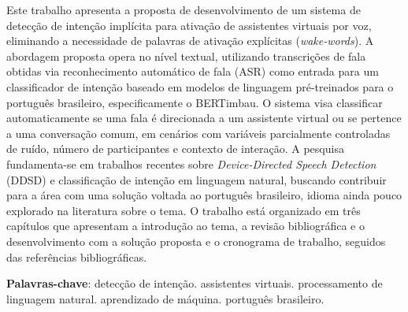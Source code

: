 \documentclass[
    12pt,                %
    openright,           %
    oneside,             %
    a4paper,             %
    english,             %
    brazil               %
]{abntex2}
\begin{document}

\frenchspacing

\pretextual

\imprimircapa

\imprimirfolhaderosto

\begin{resumo}
Este trabalho apresenta a proposta de desenvolvimento de um sistema de detecção de intenção implícita para ativação de assistentes virtuais por voz, eliminando a necessidade de palavras de ativação explícitas (\textit{wake-words}). A abordagem proposta opera no nível textual, utilizando transcrições de fala obtidas via reconhecimento automático de fala (ASR) como entrada para um classificador de intenção baseado em modelos de linguagem pré-treinados para o português brasileiro, especificamente o BERTimbau. O sistema visa classificar automaticamente se uma fala é direcionada a um assistente virtual ou se pertence a uma conversação comum, em cenários com variáveis parcialmente controladas de ruído, número de participantes e contexto de interação. A pesquisa fundamenta-se em trabalhos recentes sobre \textit{Device-Directed Speech Detection} (DDSD) e classificação de intenção em linguagem natural, buscando contribuir para a área com uma solução voltada ao português brasileiro, idioma ainda pouco explorado na literatura sobre o tema. O trabalho está organizado em três capítulos que apresentam a introdução ao tema, a revisão bibliográfica e o desenvolvimento com a solução proposta e o cronograma de trabalho, seguidos das referências bibliográficas.

\vspace{\onelineskip}

\noindent
\textbf{Palavras-chave}: detecção de intenção. assistentes virtuais. processamento de linguagem natural. aprendizado de máquina. português brasileiro.
\end{resumo}
\end{document}
